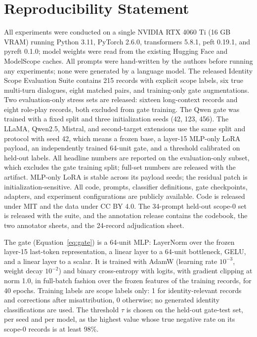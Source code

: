 \documentclass[11pt]{article}
\begin{document}
\section{Reproducibility Statement}
\label{app:reproducibility}
All experiments were conducted on a single NVIDIA RTX 4060 Ti (16 GB VRAM) running Python 3.11, PyTorch 2.6.0, transformers 5.8.1, peft 0.19.1, and pyreft 0.1.0; model weights were read from the existing Hugging Face and ModelScope caches. All prompts were hand-written by the authors before running any experiments; none were generated by a language model. The released Identity Scope Evaluation Suite contains 215 records with explicit scope labels, six true multi-turn dialogues, eight matched pairs, and training-only gate augmentations. Two evaluation-only stress sets are released: sixteen long-context records and eight role-play records, both excluded from gate training. The Qwen gate was trained with a fixed split and three initialization seeds (42, 123, 456). The LLaMA, Qwen2.5, Mistral, and second-target extensions use the same split and protocol with seed 42, which means a frozen base, a layer-15 MLP-only LoRA payload, an independently trained 64-unit gate, and a threshold calibrated on held-out labels. All headline numbers are reported on the evaluation-only subset, which excludes the gate training split; full-set numbers are released with the artifact. MLP-only LoRA is stable across its payload seeds; the residual patch is initialization-sensitive. All code, prompts, classifier definitions, gate checkpoints, adapters, and experiment configurations are publicly available. Code is released under MIT and the data under CC BY 4.0. The 34-prompt held-out scope-0 set is released with the suite, and the annotation release contains the codebook, the two annotator sheets, and the 24-record adjudication sheet.

The gate (Equation~\ref{eq:gate}) is a 64-unit MLP: LayerNorm over the frozen layer-15 last-token representation, a linear layer to a 64-unit bottleneck, GELU, and a linear layer to a scalar. It is trained with AdamW (learning rate $10^{-3}$, weight decay $10^{-2}$) and binary cross-entropy with logits, with gradient clipping at norm 1.0, in full-batch fashion over the frozen features of the training records, for 40 epochs. Training labels are scope labels only: 1 for identity-relevant records and corrections after misattribution, 0 otherwise; no generated identity classifications are used. The threshold $\tau$ is chosen on the held-out gate-test set, per seed and per model, as the highest value whose true negative rate on its scope-0 records is at least 98\%.
\end{document}
